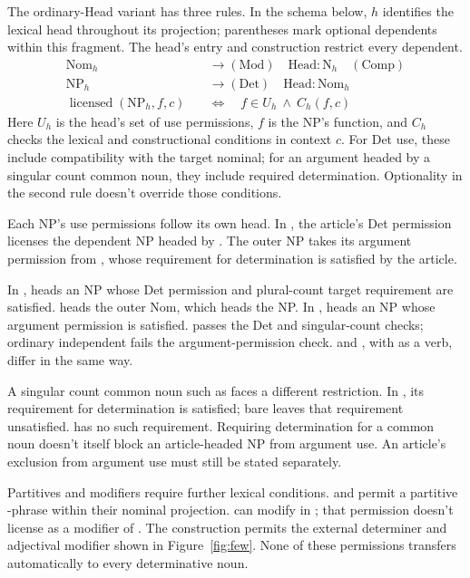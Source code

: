 \documentclass[12pt]{article}
\begin{document}
The ordinary-Head variant has three rules. In the schema below, $h$ identifies the lexical head throughout its projection; parentheses mark optional dependents within this fragment. The head's entry and construction restrict every dependent.
\[
\begin{aligned}
\mathrm{Nom}_{h} &\to (\mathrm{Mod})\quad \mathrm{Head}:\mathrm{N}_{h}\quad (\mathrm{Comp}) \\
\mathrm{NP}_{h} &\to (\mathrm{Det})\quad \mathrm{Head}:\mathrm{Nom}_{h} \\
\operatorname{licensed}(\mathrm{NP}_{h},f,c)\quad &\Longleftrightarrow\quad f\in U_h\ \land\ C_h(f,c)
\end{aligned}
\]
Here $U_h$ is the head's set of use permissions, $f$ is the NP's function, and $C_h$ checks the lexical and constructional conditions in context $c$. For Det use, these include compatibility with the target nominal; for an argument headed by a singular count common noun, they include required determination. Optionality in the second rule doesn't override those conditions.

Each NP's use permissions follow its own head. In , the article's Det permission licenses the dependent NP headed by . The outer NP takes its argument permission from , whose requirement for determination is satisfied by the article.

In ,  heads an NP whose Det permission and plural-count target requirement are satisfied.  heads the outer Nom, which heads the NP. In ,  heads an NP whose argument permission is satisfied.  passes the Det and singular-count checks; ordinary independent  fails the argument-permission check.  and , with  as a verb, differ in the same way.

A singular count common noun such as  faces a different restriction. In , its requirement for determination is satisfied; bare  leaves that requirement unsatisfied.  has no such requirement. Requiring determination for a common noun doesn't itself block an article-headed NP from argument use. An article's exclusion from argument use must still be stated separately.

Partitives and modifiers require further lexical conditions.  and  permit a partitive -phrase within their nominal projection.  can modify  in ; that permission doesn't license  as a modifier of . The construction  permits the external determiner and adjectival modifier shown in Figure~\ref{fig:few}. None of these permissions transfers automatically to every determinative noun.
\end{document}
